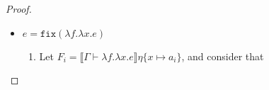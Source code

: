 \begin{proof}
\begin{itemize}
\begin{enumerate}
Let $d \in \llbracket \tau \rrbracket$, and consider that
\begin{align*}
\llbracket \Gamma \vdash e : \tau \rightarrow \tau' \rrbracket\eta\{x\mapsto  \bigvee_i a_i\}(d) 
&= \llbracket \Gamma.y : \tau \vdash e' : \tau'\rrbracket\eta\{x\mapsto  \bigvee_i a_i\}
\{y \mapsto d\} \\
&= \llbracket \Gamma.y : \tau \vdash e' : \tau'\rrbracket(\eta\{y \mapsto d\})\{x\mapsto  \bigvee_i a_i\} \\
\text{(by inductive hypothesis)}&=\bigvee_i\llbracket \Gamma.y:\tau\vdash e':\tau'\rrbracket(\eta\{y\mapsto d\})
\{x\mapsto a_i\} \\
&=\bigvee_i\llbracket \Gamma.y:\tau\vdash e':\tau'\rrbracket(\eta\{x\mapsto a_i\})\{y\mapsto d\} \\
&= \bigvee_i \llbracket \Gamma \vdash \lambda y : \tau.e' : \tau' \rrbracket \eta\{x\mapsto a_i\}(d) \\
&= \bigvee_i \llbracket \Gamma \vdash e : \tau \rightarrow \tau' \rrbracket \eta\{x\mapsto a_i\}(d) \\ 
\end{align*}
%
 \item We want to show that $\llbracket \Gamma \vdash e : \tau \rightarrow \tau' \rrbracket\eta \in \llbracket \tau \rightarrow 
 \tau'\rrbracket$---that is, it is a continuous function from $\llbracket \tau \rrbracket$ to $\llbracket \tau' \rrbracket$. Let 
 $\{a_i\}^{\infty}_{i=1}$ be a chain of elements in $\llbracket \tau \rrbracket$, and see that
 \begin{align*}
 \llbracket \Gamma \vdash e : \tau \rightarrow \tau' \rrbracket\eta(\bigvee_i a_i) &= \llbracket \Gamma.x : \tau 
 \vdash e' : \tau'\rrbracket\eta \{x \mapsto \bigvee_i a_i\} \\
 \text{(by inductive hypothesis)} &= \bigvee_i \llbracket \Gamma.x : \tau \vdash e' : \tau'\rrbracket\eta\{x\mapsto a_i\}\\
 &= \bigvee_i \llbracket \Gamma \vdash e : \tau \rightarrow \tau' \rrbracket\eta(a_i) 
 \end{align*}
 \end{enumerate} 
 We use several lemmas for this case, which are stated after the proof.
 \item $e = \texttt{fix} (\lambda f.\lambda x.e)$ \\
 \begin{enumerate}
\item Let $F_i = \llbracket \Gamma \vdash \lambda f. \lambda x.e\rrbracket\eta\{x\mapsto a_i\}$, and consider that 

\end{enumerate}
\end{itemize}
\end{proof}
